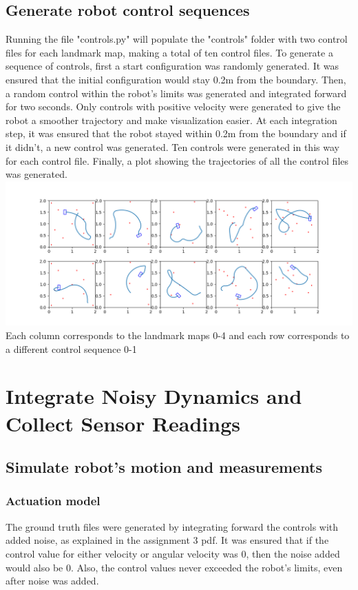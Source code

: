 \documentclass{article}
\begin{document}
\subsection{Generate robot control sequences}
Running the file "controls.py" will populate the "controls" folder with two control files for each landmark map, making a total of ten control files. To generate a sequence of controls, first a start configuration was randomly generated. It was ensured that the initial configuration would stay 0.2m from the boundary. Then, a random control within the robot's limits was generated and integrated forward for two seconds. Only controls with positive velocity were generated to give the robot a smoother trajectory and make visualization easier. At each integration step, it was ensured that the robot stayed within 0.2m from the boundary and if it didn't, a new control was generated. Ten controls were generated in this way for each control file. Finally, a plot showing the trajectories of all the control files was generated.
\includegraphics[width=\linewidth]{control_sequences_visualization.png}
Each column corresponds to the landmark maps 0-4 and each row corresponds to a different control sequence 0-1

\section{Integrate Noisy Dynamics and Collect Sensor Readings}
\subsection{Simulate robot's motion and measurements}
\subsubsection{Actuation model}
The ground truth files were generated by integrating forward the controls with added noise, as explained in the assignment 3 pdf. It was ensured that if the control value for either velocity or angular velocity was 0, then the noise added would also be 0. Also, the control values never exceeded the robot's limits, even after noise was added.
\end{document}
